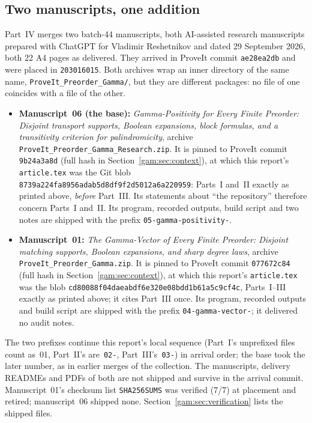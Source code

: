 \documentclass[11pt]{article}
\numberwithin{equation}{section}
\theoremstyle{definition}
\begin{document}
\subsection{Two manuscripts, one addition}
\label{gam:sec:source}
Part~IV merges two batch-44 manuscripts, both AI-assisted research
manuscripts prepared with ChatGPT for Vladimir Reshetnikov and dated
29 September 2026, both 22 A4 pages as delivered. They arrived in ProveIt
commit \texttt{ae28ea2db} and were placed in \texttt{203016015}. Both
archives wrap an inner directory of the same name,
\nolinkurl{ProveIt_Preorder_Gamma/}, but they are different packages: no
file of one coincides with a file of the other.
\begin{itemize}[leftmargin=1.4em]
\item \textbf{Manuscript~06 (the base):} \emph{Gamma-Positivity for Every
Finite Preorder: Disjoint transport supports, Boolean expansions, block
formulas, and a transitivity criterion for palindromicity}, archive
\nolinkurl{ProveIt_Preorder_Gamma_Research.zip}. It is pinned to ProveIt
commit \texttt{9b24a3a8d} (full hash in Section~\ref{gam:sec:context}), at
which this report's \texttt{article.tex} was the Git blob
\texttt{8739a224fa8956adab5d\allowbreak 8df9f2d5012a6a220959}: Parts~I
and~II exactly as printed above, \emph{before} Part~III. Its statements
about ``the repository'' therefore concern Parts~I and~II. Its program,
recorded outputs, build script and two notes are shipped with the prefix
\texttt{05-gamma-positivity-}.
\item \textbf{Manuscript~01:} \emph{The Gamma-Vector of Every Finite
Preorder: Disjoint matching supports, Boolean expansions, and sharp degree
laws}, archive \nolinkurl{ProveIt_Preorder_Gamma.zip}. It is pinned to
ProveIt commit \texttt{077672c84} (full hash in
Section~\ref{gam:sec:context}), at which this report's \texttt{article.tex}
was the blob \texttt{cd80088f04daeabdf6e3\allowbreak 20e08bdd1b61a5c9cf4c},
Parts~I--III exactly as printed above; it cites Part~III once. Its program,
recorded outputs and build script are shipped with the prefix
\texttt{04-gamma-vector-}; it delivered no audit notes.
\end{itemize}
The two prefixes continue this report's local sequence (Part~I's unprefixed
files count as~01, Part~II's are~\texttt{02-}, Part~III's~\texttt{03-}) in
arrival order; the base took the later number, as in earlier merges of the
collection. The manuscripts, delivery READMEs and PDFs of both are not
shipped and survive in the arrival commit. Manuscript~01's checksum list
\texttt{SHA256SUMS} was verified (7/7) at placement and retired;
manuscript~06 shipped none. Section~\ref{gam:sec:verification} lists the
shipped files.
\end{document}
